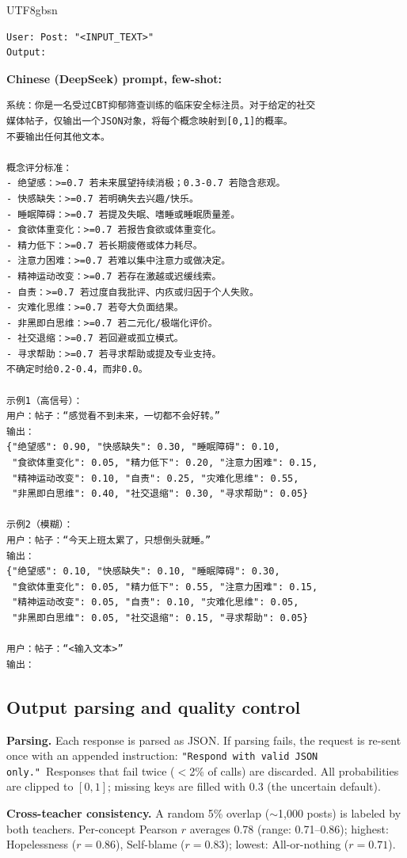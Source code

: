 \documentclass[acmsmall,natbib]{acmart}
\begin{document}
\begin{CJK*}{UTF8}{gbsn}
\begin{verbatim}
User: Post: "<INPUT_TEXT>"
Output:
\end{verbatim}

\noindent\textbf{Chinese (DeepSeek) prompt, few-shot:}
\begin{verbatim}
系统：你是一名受过CBT抑郁筛查训练的临床安全标注员。对于给定的社交
媒体帖子，仅输出一个JSON对象，将每个概念映射到[0,1]的概率。
不要输出任何其他文本。

概念评分标准：
- 绝望感：>=0.7 若未来展望持续消极；0.3-0.7 若隐含悲观。
- 快感缺失：>=0.7 若明确失去兴趣/快乐。
- 睡眠障碍：>=0.7 若提及失眠、嗜睡或睡眠质量差。
- 食欲体重变化：>=0.7 若报告食欲或体重变化。
- 精力低下：>=0.7 若长期疲倦或体力耗尽。
- 注意力困难：>=0.7 若难以集中注意力或做决定。
- 精神运动改变：>=0.7 若存在激越或迟缓线索。
- 自责：>=0.7 若过度自我批评、内疚或归因于个人失败。
- 灾难化思维：>=0.7 若夸大负面结果。
- 非黑即白思维：>=0.7 若二元化/极端化评价。
- 社交退缩：>=0.7 若回避或孤立模式。
- 寻求帮助：>=0.7 若寻求帮助或提及专业支持。
不确定时给0.2-0.4，而非0.0。

示例1（高信号）：
用户：帖子：“感觉看不到未来，一切都不会好转。”
输出：
{"绝望感": 0.90, "快感缺失": 0.30, "睡眠障碍": 0.10,
 "食欲体重变化": 0.05, "精力低下": 0.20, "注意力困难": 0.15,
 "精神运动改变": 0.10, "自责": 0.25, "灾难化思维": 0.55,
 "非黑即白思维": 0.40, "社交退缩": 0.30, "寻求帮助": 0.05}

示例2（模糊）：
用户：帖子：“今天上班太累了，只想倒头就睡。”
输出：
{"绝望感": 0.10, "快感缺失": 0.10, "睡眠障碍": 0.30,
 "食欲体重变化": 0.05, "精力低下": 0.55, "注意力困难": 0.15,
 "精神运动改变": 0.05, "自责": 0.10, "灾难化思维": 0.05,
 "非黑即白思维": 0.05, "社交退缩": 0.15, "寻求帮助": 0.05}

用户：帖子：“<输入文本>”
输出：
\end{verbatim}

\subsection{Output parsing and quality control}
\label{app:parsing}
\textbf{Parsing.} Each response is parsed as JSON. If parsing fails, the request is re-sent once with an appended instruction: \texttt{"Respond with valid JSON only."}~Responses that fail twice ($<$2\% of calls) are discarded. All probabilities are clipped to $[0,1]$; missing keys are filled with 0.3 (the uncertain default).

\noindent\textbf{Cross-teacher consistency.} A random 5\% overlap (${\sim}$1{,}000 posts) is labeled by both teachers. Per-concept Pearson $r$ averages 0.78 (range: 0.71--0.86); highest: Hopelessness ($r{=}0.86$), Self-blame ($r{=}0.83$); lowest: All-or-nothing ($r{=}0.71$).


\end{CJK*}
\end{document}
